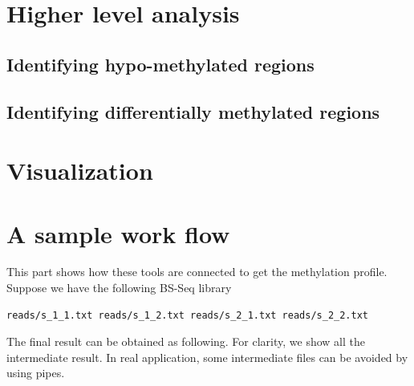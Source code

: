 \documentclass{article}
\begin{document}
\section{Higher level analysis}
\label{sec:high-level-analys}

\subsection{Identifying hypo-methylated regions}
\label{sec:ident-hypo-methyl}

\subsection{Identifying differentially methylated regions}
\label{sec:ident-diff-methyl}


\section{Visualization}
\label{sec:visualization}





\section{A sample work flow}
This part shows how these tools are connected to get the methylation
profile. Suppose we have the following BS-Seq library
\begin{verbatim}
reads/s_1_1.txt reads/s_1_2.txt reads/s_2_1.txt reads/s_2_2.txt
\end{verbatim}

The final result can be obtained as following. For clarity, we show
all the intermediate result. In real application, some intermediate
files can be avoided by using pipes.
\end{document}

